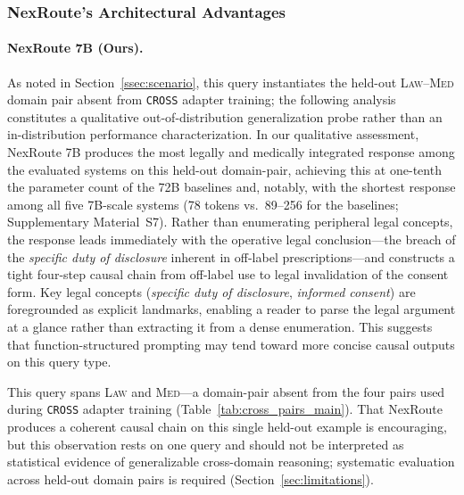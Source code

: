 \documentclass[a4paper,fleql]{cas-sc}
\begin{document}
\subsubsection{NexRoute's Architectural Advantages}
\label{sssec:nexroute-advantages}

\paragraph{NexRoute 7B (Ours).}
As noted in Section~\ref{ssec:scenario}, this query instantiates the held-out
\textsc{Law}--\textsc{Med} domain pair absent from \texttt{CROSS} adapter
training; the following analysis constitutes a qualitative out-of-distribution
generalization probe rather than an in-distribution performance characterization.
In our qualitative assessment, NexRoute 7B produces the most legally and
medically integrated response among the evaluated systems on this held-out
domain-pair, achieving this at one-tenth
the parameter count of the 72B baselines and, notably, with the shortest response
among all five 7B-scale systems (78 tokens vs.\ 89--256 for the baselines;
Supplementary Material~S7).
Rather than enumerating peripheral legal concepts, the response leads
immediately with the operative legal conclusion---the breach of the
\textit{specific duty of disclosure} inherent in off-label prescriptions---and
constructs a tight four-step causal chain from off-label use to legal
invalidation of the consent form. Key legal concepts (\textit{specific duty
of disclosure}, \textit{informed consent}) are foregrounded as explicit
landmarks, enabling a reader to parse the legal argument at a glance rather
than extracting it from a dense enumeration. This suggests that function-structured prompting may tend toward more concise
causal outputs on this query type.

This query spans \textsc{Law} and \textsc{Med}---a domain-pair absent from
the four pairs used during \texttt{CROSS} adapter training
(Table~\ref{tab:cross_pairs_main}). That NexRoute produces a coherent causal
chain on this single held-out example is encouraging, but this observation
rests on one query and should not be interpreted as statistical evidence of
generalizable cross-domain reasoning; systematic evaluation across held-out
domain pairs is required (Section~\ref{sec:limitations}).
\end{document}
